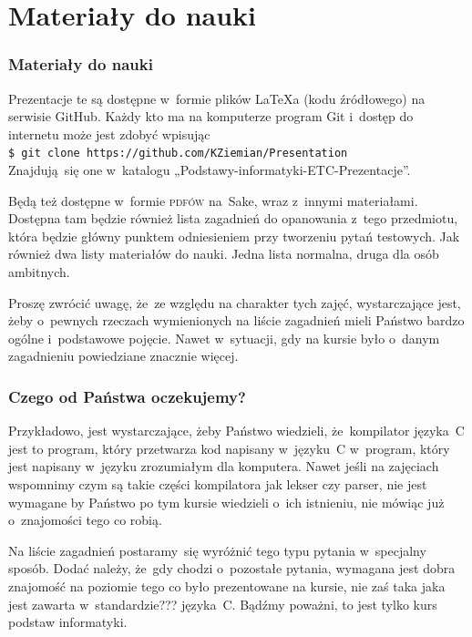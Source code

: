 \documentclass[10pt,t]{beamer}
\begin{document}
\section{Materiały do nauki}



\begin{frame}
  \frametitle{Materiały do nauki}


  Prezentacje te są dostępne w~formie plików \LaTeX a (kodu źródłowego)
  na serwisie GitHub. Każdy kto ma na komputerze program Git i~dostęp
  do internetu może jest zdobyć wpisując \\
  \texttt{\$ git clone https://github.com/KZiemian/Presentation} \\
  Znajdują~się one w~katalogu „Podstawy-informatyki-ETC-Prezentacje”.

  Będą też dostępne w~formie \textsc{pdfów} na~Sake, wraz z~innymi
  materiałami. Dostępna tam będzie również lista zagadnień do opanowania
  z~tego przedmiotu, która będzie główny punktem odniesieniem przy
  tworzeniu pytań testowych. Jak również dwa listy materiałów do nauki.
  Jedna lista normalna, druga dla osób ambitnych.

  Proszę zwrócić uwagę, że~ze względu na charakter tych zajęć, wystarczające
  jest, żeby o~pewnych rzeczach wymienionych na liście zagadnień mieli
  Państwo bardzo ogólne i~podstawowe pojęcie. Nawet w~sytuacji, gdy na
  kursie było o~danym zagadnieniu powiedziane znacznie więcej.

\end{frame}





\begin{frame}
  \frametitle{Czego od Państwa oczekujemy?}


  Przykładowo, jest wystarczające, żeby Państwo wiedzieli, że~kompilator
  języka~C jest to program, który przetwarza kod napisany w~języku~C
  w~program, który jest napisany w~języku zrozumiałym dla komputera.
  Nawet jeśli na zajęciach wspomnimy czym są takie części kompilatora
  jak lekser czy parser, nie jest wymagane by Państwo po tym kursie
  wiedzieli o~ich istnieniu, nie mówiąc już o~znajomości tego co robią.

  Na liście zagadnień postaramy~się wyróżnić tego typu pytania w~specjalny
  sposób. Dodać należy, że~gdy chodzi o~pozostałe pytania, wymagana jest
  dobra znajomość na \alert{poziomie tego co było prezentowane na kursie},
  nie zaś taka jaka jest zawarta w~standardzie??? języka~C. Bądźmy poważni,
  to jest tylko kurs podstaw informatyki.

\end{frame}
\end{document}
